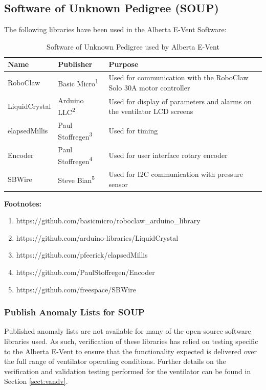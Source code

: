 \documentclass[]{article}
\begin{document}
\subsection{Software of Unknown Pedigree (SOUP)}
\label{sect:soup}

The following libraries have been used in the Alberta E-Vent Software:

\begin{center}
	\begin{table}[h]
		\caption{Software of Unknown Pedigree used by Alberta E-Vent}
		\label{tab:sw_soup}
		\begin{tabular}{ |p{3cm}|p{3cm}|p{8cm}|}
			
			\hline
			\textbf{Name} & \textbf{Publisher} & \textbf{Purpose}  \\ \hline
			RoboClaw & Basic Micro\textsuperscript{1} & Used for communication with the RoboClaw Solo 30A motor controller \\ \hline
			LiquidCrystal & Arduino LLC\textsuperscript{2} & Used for display of parameters and alarms on the ventilator LCD screens\\ \hline
			elapsedMillis & Paul Stoffregen\textsuperscript{3} & Used for timing\\ \hline
			Encoder & Paul Stoffregen\textsuperscript{4} & Used for user interface rotary encoder\\ \hline
			SBWire & Steve Bian\textsuperscript{5} & Used for I2C communication with pressure sensor\\ \hline			
		\end{tabular}
	\end{table}	
\end{center}

\noindent \textbf{Footnotes:}
\begin{enumerate}
	\item https://github.com/basicmicro/roboclaw\_arduino\_library
	\item https://github.com/arduino-libraries/LiquidCrystal
	\item https://github.com/pfeerick/elapsedMillis
	\item https://github.com/PaulStoffregen/Encoder
	\item https://github.com/freespace/SBWire
\end{enumerate}


\subsubsection{Publish Anomaly Lists for SOUP}
Published anomaly lists are not available for many of the open-source software libraries used.  As such, verification of these libraries has relied on testing specific to the Alberta E-Vent to ensure that the functionality expected is delivered over the full range of ventilator operating conditions.  Further details on the verification and validation testing performed for the ventilator can be found in Section \ref{sect:vandv}.
\end{document}
